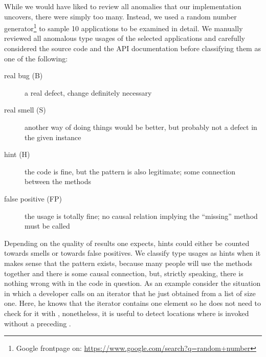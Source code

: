 While we would have liked to review all anomalies that our implementation uncovers, there were simply too many.
Instead, we used a random number generator\footnote{Google frontpage on: \url{https://www.google.com/search?q=random+number}} to sample 10 applications to be examined in detail.
We manually reviewed all anomalous type usages of the selected applications and carefully considered the source code and the API documentation before classifying them as one of the following:
\begin{description}
    \item [real bug (B)] a real defect, change definitely necessary
    \item [real smell (S)] another way of doing things would be better, but probably not a defect in the given instance
    \item [hint (H)] the code is fine, but the pattern is also legitimate; some connection between the methods
    \item [false positive (FP)] the usage is totally fine; no causal relation implying the ``missing'' method must be called
\end{description}


Depending on the quality of results one expects, hints could either be counted towards smells or towards false positives.
We classify type usages as hints when it makes sense that the pattern exists, because many people will use the methods together and there is some causal connection, but, strictly speaking, there is nothing wrong with in the code in question.
As an example consider the situation in which a developer calls  on an iterator that he just obtained from a list of size one.
Here, he knows that the iterator contains one element so he does not need to check for it with , nonetheless, it is useful to detect locations where  is invoked without a preceding .


